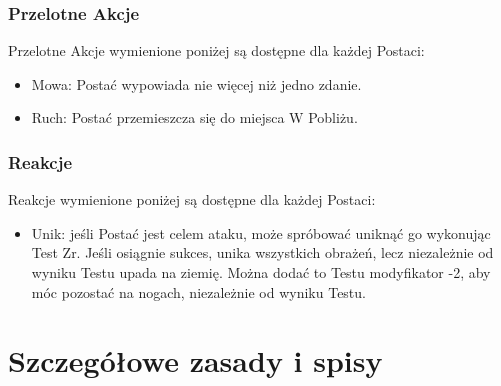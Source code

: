 \documentclass[10pt,a4paper]{book}
\begin{document}
\begin{multicols}{2}
\subsection*{Przelotne Akcje}
Przelotne Akcje wymienione poniżej są dostępne dla każdej Postaci:
\begin{itemize}
	\item Mowa: Postać wypowiada nie więcej niż jedno zdanie.
	\item Ruch: Postać przemieszcza się do miejsca W Pobliżu. 
\end{itemize}


\subsection*{Reakcje}
Reakcje wymienione poniżej są dostępne dla każdej Postaci:
\begin{itemize}
	\item Unik: jeśli Postać jest celem ataku, może spróbować uniknąć go wykonując Test Zr. Jeśli osiągnie sukces, unika wszystkich obrażeń, lecz niezależnie od wyniku Testu upada na ziemię. Można dodać to Testu modyfikator -2, aby móc pozostać na nogach, niezależnie od wyniku Testu.
\end{itemize}


\end{multicols}



\chapter{Szczegółowe zasady i spisy}
\end{document}
